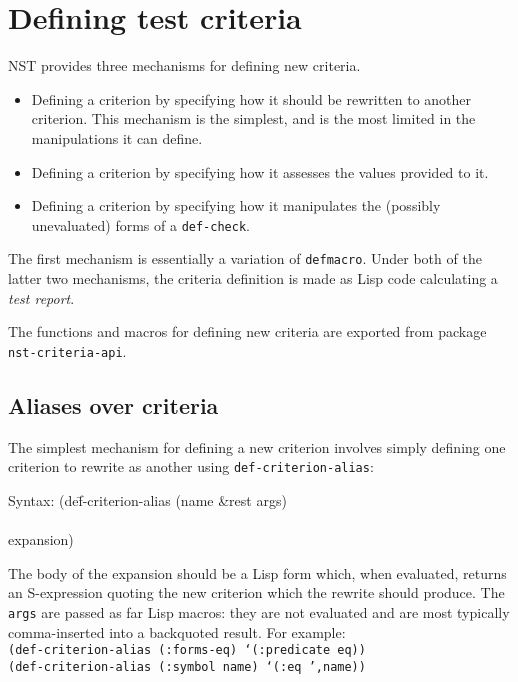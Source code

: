 \section{Defining test criteria}
NST provides three mechanisms for defining new criteria.
\begin{itemize}
\item Defining a criterion by specifying how it should be rewritten to
  another criterion.  This mechanism is the simplest, and is the most
  limited in the manipulations it can define.
\item Defining a criterion by specifying how it assesses the values
  provided to it.
\item Defining a criterion by specifying how it manipulates the
  (possibly unevaluated) forms of a \texttt{def-check}.
\end{itemize}
The first mechanism is essentially a variation of \texttt{defmacro}.
Under both of the latter two mechanisms, the criteria definition is
made as Lisp code calculating a \emph{test report}.

The functions and macros for defining new criteria are exported from
package \texttt{nst-criteria-api}.

\subsection{Aliases over criteria}
\label{sec:def-criterion-alias}
The simplest mechanism for defining a new criterion involves simply
defining one criterion to rewrite as another using
\texttt{def-criterion-alias}:
%
{\ttfamily\begin{tabbing}
\textrm{Syntax: 
}(de\=f-criterion-alias (name \&rest args)
\\ \> [ documentation ]
\\ \> expansion)
\end{tabbing}}
The body of the expansion should be a Lisp form which, when evaluated,
returns an S-expression quoting the new criterion which the rewrite
should produce.  The \texttt{args} are passed as far Lisp macros: they
are not evaluated and are most typically comma-inserted into a
backquoted result.  For example:
\\ \texttt{(def-criterion-alias (:forms-eq) `(:predicate eq))}
\\ \texttt{(def-criterion-alias (:symbol name) `(:eq ',name))}

